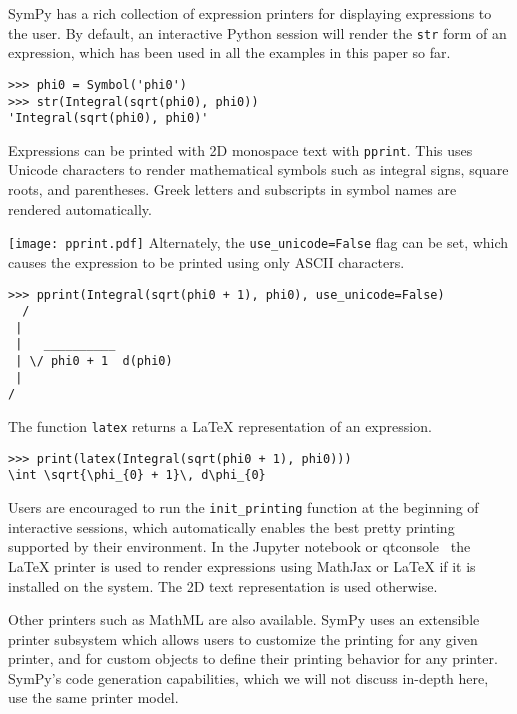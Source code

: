 
SymPy has a rich collection of expression printers for displaying expressions
to the user. By default, an interactive Python session will render the
\verb|str| form of an expression, which has been used in all the examples in
this paper so far.

\begin{verbatim}
>>> phi0 = Symbol('phi0')
>>> str(Integral(sqrt(phi0), phi0))
'Integral(sqrt(phi0), phi0)'
\end{verbatim}

Expressions can be printed with 2D monospace text with \verb|pprint|. This
uses Unicode characters to render mathematical symbols such as integral signs,
square roots, and parentheses. Greek letters and subscripts in symbol names
are rendered automatically.

\noindent
\texttt{[image: pprint.pdf]}
Alternately, the \verb|use_unicode=False| flag can be set, which causes the
expression to be printed using only ASCII characters.

\begin{verbatim}
>>> pprint(Integral(sqrt(phi0 + 1), phi0), use_unicode=False)
  /
 |
 |   __________
 | \/ phi0 + 1  d(phi0)
 |
/
\end{verbatim}

The function \verb|latex| returns a \LaTeX{} representation of an expression.

\begin{verbatim}
>>> print(latex(Integral(sqrt(phi0 + 1), phi0)))
\int \sqrt{\phi_{0} + 1}\, d\phi_{0}
\end{verbatim}

Users are encouraged to run the \verb|init_printing| function at the beginning
of interactive sessions, which automatically enables the best pretty printing
supported by their environment. In the Jupyter notebook or
qtconsole~\cite{perez2007ipython} the \LaTeX{} printer is used to render
expressions using MathJax or \LaTeX{} if it is installed on the system. The 2D
text representation is used otherwise.

Other printers such as MathML are also available. SymPy uses an extensible
printer subsystem which allows users to customize the printing for any given
printer, and for custom objects to define their printing behavior for any
printer. SymPy's code generation capabilities, which we will not discuss
in-depth here, use the same printer model.
